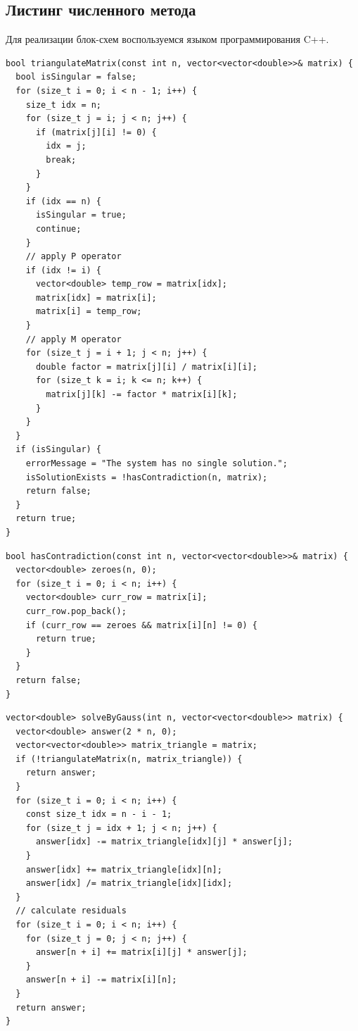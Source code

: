 \subsection{Листинг численного метода}

Для реализации блок-схем воспользуемся языком программирования C++.

\begin{lstlisting}[caption=Прямой шаг метода Гаусса.]
bool triangulateMatrix(const int n, vector<vector<double>>& matrix) {
  bool isSingular = false;
  for (size_t i = 0; i < n - 1; i++) {
    size_t idx = n;
    for (size_t j = i; j < n; j++) {
      if (matrix[j][i] != 0) {
        idx = j;
        break;
      }
    }
    if (idx == n) {
      isSingular = true;
      continue;
    }
    // apply P operator
    if (idx != i) {
      vector<double> temp_row = matrix[idx];
      matrix[idx] = matrix[i];
      matrix[i] = temp_row;
    }
    // apply M operator
    for (size_t j = i + 1; j < n; j++) {
      double factor = matrix[j][i] / matrix[i][i];
      for (size_t k = i; k <= n; k++) {
        matrix[j][k] -= factor * matrix[i][k];
      }
    }
  }
  if (isSingular) {
    errorMessage = "The system has no single solution.";
    isSolutionExists = !hasContradiction(n, matrix);
    return false;
  }
  return true;
}
\end{lstlisting}

\begin{lstlisting}[caption=Проверка системы на совместность.]
bool hasContradiction(const int n, vector<vector<double>>& matrix) {
  vector<double> zeroes(n, 0);
  for (size_t i = 0; i < n; i++) {
    vector<double> curr_row = matrix[i];
    curr_row.pop_back();
    if (curr_row == zeroes && matrix[i][n] != 0) {
      return true;
    }
  }
  return false;
}
\end{lstlisting}

\begin{lstlisting}[caption=Обратный шаг метода Гаусса.]
vector<double> solveByGauss(int n, vector<vector<double>> matrix) {
  vector<double> answer(2 * n, 0);
  vector<vector<double>> matrix_triangle = matrix;
  if (!triangulateMatrix(n, matrix_triangle)) {
    return answer;
  }
  for (size_t i = 0; i < n; i++) {
    const size_t idx = n - i - 1;
    for (size_t j = idx + 1; j < n; j++) {
      answer[idx] -= matrix_triangle[idx][j] * answer[j]; 
    }
    answer[idx] += matrix_triangle[idx][n];
    answer[idx] /= matrix_triangle[idx][idx];
  }
  // calculate residuals
  for (size_t i = 0; i < n; i++) {
    for (size_t j = 0; j < n; j++) {
      answer[n + i] += matrix[i][j] * answer[j];
    }
    answer[n + i] -= matrix[i][n];
  }
  return answer;
}
\end{lstlisting}